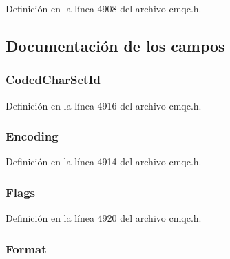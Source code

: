 Definición en la línea 4908 del archivo cmqc.\+h.



\subsection{Documentación de los campos}
\hypertarget{structtag_m_q_r_f_h2_a4d8d1961a991850d1355cdf9b4680b8e}{}
\subsubsection[{Coded\+Char\+Set\+Id}]{ Coded\+Char\+Set\+Id}\label{structtag_m_q_r_f_h2_a4d8d1961a991850d1355cdf9b4680b8e}


Definición en la línea 4916 del archivo cmqc.\+h.

\hypertarget{structtag_m_q_r_f_h2_a30167bf454a49a60fd3fe4e9e586af34}{}
\subsubsection[{Encoding}]{ Encoding}\label{structtag_m_q_r_f_h2_a30167bf454a49a60fd3fe4e9e586af34}


Definición en la línea 4914 del archivo cmqc.\+h.

\hypertarget{structtag_m_q_r_f_h2_a8da770267273b200fa9c968fa2a0da57}{}
\subsubsection[{Flags}]{ Flags}\label{structtag_m_q_r_f_h2_a8da770267273b200fa9c968fa2a0da57}


Definición en la línea 4920 del archivo cmqc.\+h.

\hypertarget{structtag_m_q_r_f_h2_a435a478822008713f8aaff89f369ed63}{}
\subsubsection[{Format}]{ Format}\label{structtag_m_q_r_f_h2_a435a478822008713f8aaff89f369ed63}


